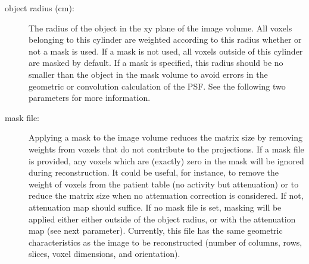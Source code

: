 \documentclass{article}
\begin{document}
{{\begin{description}
\item[object radius (cm):] The radius of the object in the xy plane of the image volume. All voxels belonging to this cylinder are weighted according to this radius whether or not a mask is used. If a mask is not used, all voxels outside of this cylinder are masked by default. If a mask is specified, this radius should be no smaller than the object in the mask volume to avoid errors in the geometric or convolution calculation of the PSF. See the following two parameters for more information.







\item[mask file:] Applying a mask to the image volume reduces the matrix size by removing weights from voxels that do not contribute to the projections. If a mask file is provided, any voxels which are (exactly) zero in the mask will be ignored during reconstruction. It could be useful, for instance, to remove the weight of voxels from the patient table (no activity but attenuation) or to reduce the matrix size when no attenuation correction is considered. If not, attenuation map should suffice. If no mask file is set, masking will be applied either either outside of the object radius, or with the attenuation map (see next parameter).  Currently, this file has the same geometric characteristics as the image to be reconstructed (number of columns, rows, slices, voxel dimensions, and orientation).


\end{description}}}
\end{document}
